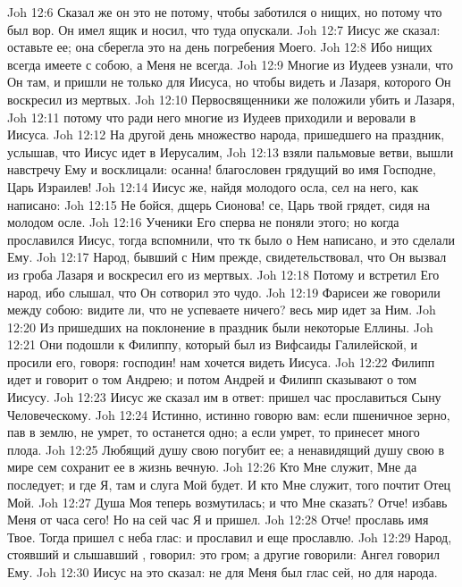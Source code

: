 \vs Joh 12:6 Сказал же он это не потому, чтобы заботился о нищих, но потому что был вор. Он имел  ящик и носил, что туда опускали.
\vs Joh 12:7 Иисус же сказал: оставьте ее; она сберегла это на день погребения Моего.
\vs Joh 12:8 Ибо нищих всегда имеете с собою, а Меня не всегда.
\vs Joh 12:9 Многие из Иудеев узнали, что Он там, и пришли не только для Иисуса, но чтобы видеть и Лазаря, которого Он воскресил из мертвых.
\vs Joh 12:10 Первосвященники же положили убить и Лазаря,
\vs Joh 12:11 потому что ради него многие из Иудеев приходили и веровали в Иисуса.
\vs Joh 12:12 На другой день множество народа, пришедшего на праздник, услышав, что Иисус идет в Иерусалим,
\rsbpar\vs Joh 12:13 взяли пальмовые ветви, вышли навстречу Ему и восклицали: осанна! благословен грядущий во имя Господне, Царь Израилев!
\vs Joh 12:14 Иисус же, найдя молодого осла, сел на него, как написано:
\vs Joh 12:15 Не бойся, дщерь Сионова! се, Царь твой грядет, сидя на молодом осле.
\vs Joh 12:16 Ученики Его сперва не поняли этого; но когда прославился Иисус, тогда вспомнили, что тк было о Нем написано, и это сделали Ему.
\vs Joh 12:17 Народ, бывший с Ним прежде, свидетельствовал, что Он вызвал из гроба Лазаря и воскресил его из мертвых.
\vs Joh 12:18 Потому и встретил Его народ, ибо слышал, что Он сотворил это чудо.
\vs Joh 12:19 Фарисеи же говорили между собою: видите ли, что не успеваете ничего? весь мир идет за Ним.
\rsbpar\vs Joh 12:20 Из пришедших на поклонение в праздник были некоторые Еллины.
\vs Joh 12:21 Они подошли к Филиппу, который был из Вифсаиды Галилейской, и просили его, говоря: господин! нам хочется видеть Иисуса.
\vs Joh 12:22 Филипп идет и говорит о том Андрею; и потом Андрей и Филипп сказывают о том Иисусу.
\vs Joh 12:23 Иисус же сказал им в ответ: пришел час прославиться Сыну Человеческому.
\vs Joh 12:24 Истинно, истинно говорю вам: если пшеничное зерно, пав в землю, не умрет, то останется одно; а если умрет, то принесет много плода.
\vs Joh 12:25 Любящий душу свою погубит ее; а ненавидящий душу свою в мире сем сохранит ее в жизнь вечную.
\vs Joh 12:26 Кто Мне служит, Мне да последует; и где Я, там и слуга Мой будет. И кто Мне служит, того почтит Отец Мой.
\vs Joh 12:27 Душа Моя теперь возмутилась; и что Мне сказать? Отче! избавь Меня от часа сего! Но на сей час Я и пришел.
\rsbpar\vs Joh 12:28 Отче! прославь имя Твое. Тогда пришел с неба глас: и прославил и еще прославлю.
\vs Joh 12:29 Народ, стоявший и слышавший , говорил: это гром; а другие говорили: Ангел говорил Ему.
\vs Joh 12:30 Иисус на это сказал: не для Меня был глас сей, но для народа.
